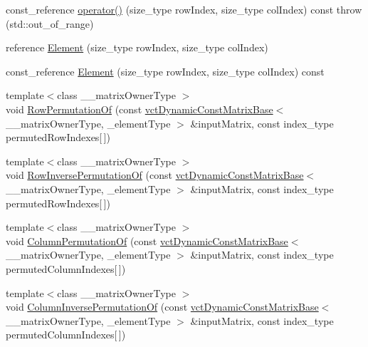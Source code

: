 \begin{DoxyCompactItemize}
\item 
const\-\_\-reference \hyperlink{classvct_dynamic_matrix_base_ab58164aef4b2d4e45340816f9ece2261}{operator()} (size\-\_\-type row\-Index, size\-\_\-type col\-Index) const   throw (std\-::out\-\_\-of\-\_\-range)
\item 
reference \hyperlink{classvct_dynamic_matrix_base_a996e62823119b25a18255e05ade49446}{Element} (size\-\_\-type row\-Index, size\-\_\-type col\-Index)
\item 
const\-\_\-reference \hyperlink{classvct_dynamic_matrix_base_a33ed80b9a281c2939dd9069b4b4d2d9b}{Element} (size\-\_\-type row\-Index, size\-\_\-type col\-Index) const 
\item 
{\footnotesize template$<$class \-\_\-\-\_\-matrix\-Owner\-Type $>$ }\\void \hyperlink{classvct_dynamic_matrix_base_ab472d1eefb5f1a9f44470a06f5dff6fc}{Row\-Permutation\-Of} (const \hyperlink{classvct_dynamic_const_matrix_base}{vct\-Dynamic\-Const\-Matrix\-Base}$<$ \-\_\-\-\_\-matrix\-Owner\-Type, \-\_\-element\-Type $>$ \&input\-Matrix, const index\-\_\-type permuted\-Row\-Indexes\mbox{[}$\,$\mbox{]})
\item 
{\footnotesize template$<$class \-\_\-\-\_\-matrix\-Owner\-Type $>$ }\\void \hyperlink{classvct_dynamic_matrix_base_a3669cd2217012657d5d3eed0c454216c}{Row\-Inverse\-Permutation\-Of} (const \hyperlink{classvct_dynamic_const_matrix_base}{vct\-Dynamic\-Const\-Matrix\-Base}$<$ \-\_\-\-\_\-matrix\-Owner\-Type, \-\_\-element\-Type $>$ \&input\-Matrix, const index\-\_\-type permuted\-Row\-Indexes\mbox{[}$\,$\mbox{]})
\item 
{\footnotesize template$<$class \-\_\-\-\_\-matrix\-Owner\-Type $>$ }\\void \hyperlink{classvct_dynamic_matrix_base_abc8ce418ac2652c25ff8ac707d536ba1}{Column\-Permutation\-Of} (const \hyperlink{classvct_dynamic_const_matrix_base}{vct\-Dynamic\-Const\-Matrix\-Base}$<$ \-\_\-\-\_\-matrix\-Owner\-Type, \-\_\-element\-Type $>$ \&input\-Matrix, const index\-\_\-type permuted\-Column\-Indexes\mbox{[}$\,$\mbox{]})
\item 
{\footnotesize template$<$class \-\_\-\-\_\-matrix\-Owner\-Type $>$ }\\void \hyperlink{classvct_dynamic_matrix_base_ac46e977f79289e6253bdc4bf0c7f24d6}{Column\-Inverse\-Permutation\-Of} (const \hyperlink{classvct_dynamic_const_matrix_base}{vct\-Dynamic\-Const\-Matrix\-Base}$<$ \-\_\-\-\_\-matrix\-Owner\-Type, \-\_\-element\-Type $>$ \&input\-Matrix, const index\-\_\-type permuted\-Column\-Indexes\mbox{[}$\,$\mbox{]})

\end{DoxyCompactItemize}
